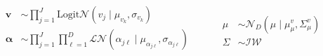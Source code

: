 \begin{equation}
    \begin{aligned}
        \bm{v} &\sim {\textstyle\prod}_{j = 1}^J \text{Logit}\mathcal{N}(v_j\mid\mu_{v_k},\sigma_{v_k})\\
        \bm{\alpha} &\sim  {\textstyle\prod}_{j = 1}^J{\textstyle\prod}_{\ell = 1}^D\mathcal{LN}(\alpha_{j\ell}\mid\mu_{\alpha_{j\ell}},\sigma_{\alpha_{j\ell}})\\        
    \end{aligned}
    ~\hspace{1cm}
    \begin{aligned}
        \mu &\sim \mathcal{N}_D(\mu\mid\mu_{\mu}^v,\Sigma_{\mu}^v)\\
        \Sigma &\sim \mathcal{IW}
    \end{aligned}
\end{equation}

